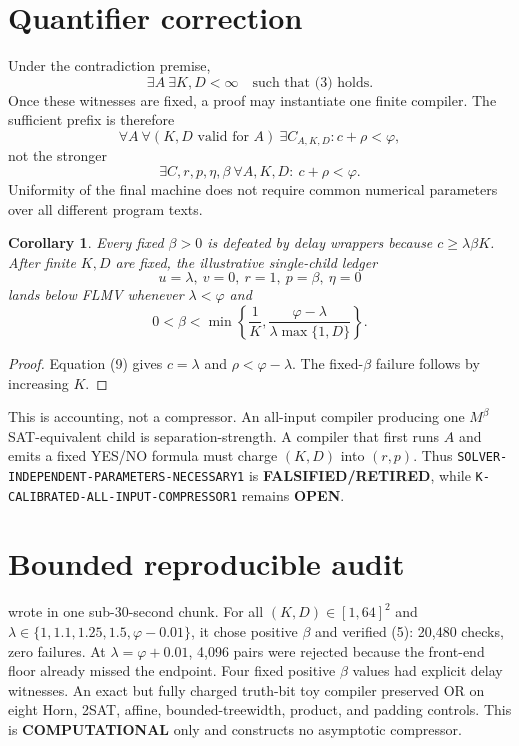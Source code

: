 \documentclass[11pt]{article}
\newtheorem{corollary}{Corollary}
\newcommand{\COMP}{\textbf{COMPUTATIONAL}}
\newcommand{\OPEN}{\textbf{OPEN}}
\newcommand{\RETIRED}{\textbf{FALSIFIED/RETIRED}}
\begin{document}
\section{Quantifier correction}
Under the contradiction premise,
\[
 \exists A\ \exists K,D<\infty\quad\text{such that (3) holds}. \tag{6}
\]
Once these witnesses are fixed, a proof may instantiate one finite compiler.
The sufficient prefix is therefore
\[
 \forall A\ \forall(K,D\text{ valid for }A)\ \exists C_{A,K,D}:
 c+\rho<\varphi, \tag{7}
\]
not the stronger
\[
 \exists C,r,p,\eta,\beta\ \forall A,K,D:\ c+\rho<\varphi. \tag{8}
\]
Uniformity of the final machine does not require common numerical parameters
over all different program texts.

\begin{corollary}
Every fixed $\beta>0$ is defeated by delay wrappers because
$c\ge\lambda\beta K$. After finite $K,D$ are fixed, the illustrative
single-child ledger
\[
 u=\lambda,\ v=0,\ r=1,\ p=\beta,\ \eta=0
\]
lands below FLMV whenever $\lambda<\varphi$ and
\[
 0<\beta<\min\left\{\frac1K,
 \frac{\varphi-\lambda}{\lambda\max\{1,D\}}\right\}. \tag{9}
\]
\end{corollary}
\begin{proof}
Equation (9) gives $c=\lambda$ and
$\rho<\varphi-\lambda$. The fixed-$\beta$ failure follows by increasing $K$.
\end{proof}

This is accounting, not a compressor. An all-input compiler producing one
$M^\beta$ SAT-equivalent child is separation-strength. A compiler that first
runs $A$ and emits a fixed YES/NO formula must charge $(K,D)$ into $(r,p)$.
Thus \texttt{SOLVER-INDEPENDENT-PARAMETERS-NECESSARY1} is \RETIRED, while
\texttt{K-CALIBRATED-ALL-INPUT-COMPRESSOR1} remains \OPEN.

\section{Bounded reproducible audit}
 wrote
 in one
sub-30-second chunk. For all $(K,D)\in[1,64]^2$ and
$\lambda\in\{1,1.1,1.25,1.5,\varphi-0.01\}$, it chose positive $\beta$ and
verified (5): 20,480 checks, zero failures. At
$\lambda=\varphi+0.01$, 4,096 pairs were rejected because the front-end floor
already missed the endpoint. Four fixed positive $\beta$ values had explicit
delay witnesses. An exact but fully charged truth-bit toy compiler preserved
OR on eight Horn, 2SAT, affine, bounded-treewidth, product, and padding
controls. This is \COMP{} only and constructs no asymptotic compressor.
\end{document}
